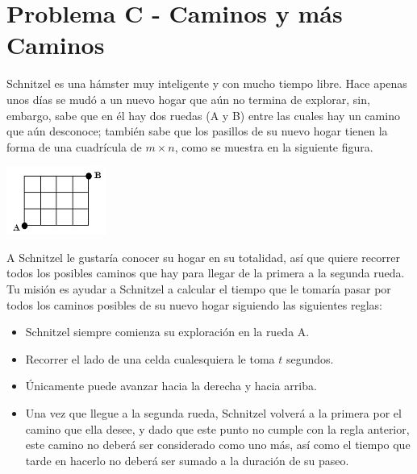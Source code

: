 \chapter*{Problema C - Caminos y más Caminos}


Schnitzel es una hámster muy inteligente y con mucho tiempo libre. Hace apenas unos días se mudó a un nuevo hogar que aún no termina de explorar, sin, embargo, sabe que en él hay dos ruedas (A y B) entre las cuales hay un camino que aún desconoce; también sabe que los pasillos de su nuevo hogar tienen la forma de una cuadrícula de $m \times n$, como se muestra en la siguiente figura.

\begin{center}
\includegraphics{Cuadricula}
\end{center}

A Schnitzel le gustaría conocer su hogar en su totalidad, así que quiere recorrer todos los posibles caminos que hay para llegar de la primera a la segunda rueda. Tu misión es ayudar a Schnitzel a calcular el tiempo que le tomaría pasar por todos los caminos posibles de su nuevo hogar siguiendo las siguientes reglas:

\begin{itemize}
    \item Schnitzel siempre comienza su exploración en la rueda A.
    \item Recorrer el lado de una celda cualesquiera le toma $t$ segundos.
    \item Únicamente puede avanzar hacia la derecha y hacia arriba.
    \item Una vez que llegue a la segunda rueda, Schnitzel volverá a la primera por el camino que ella desee, y  dado que este punto no cumple con la regla anterior, este camino no deberá ser considerado como uno más, así como el tiempo que tarde en hacerlo no deberá ser sumado a la duración de su paseo.
\end{itemize}


